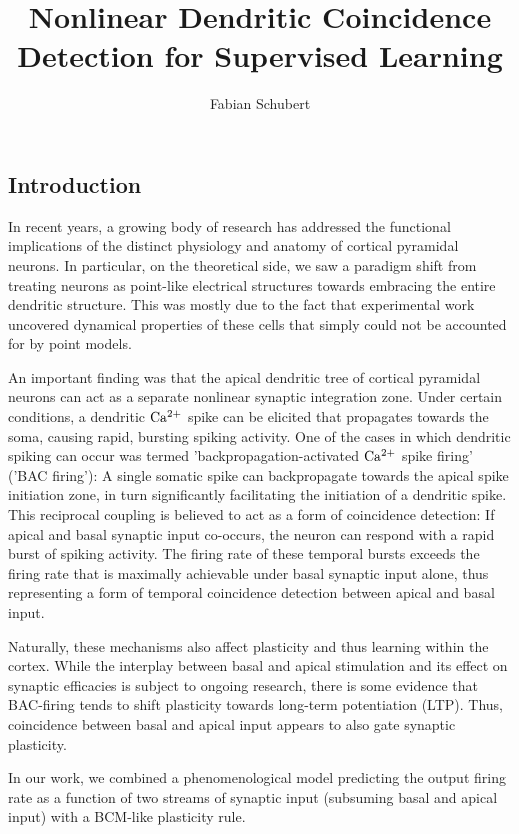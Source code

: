\documentclass[10pt,a4paper]{article}
\author{Fabian Schubert}
\title{Nonlinear Dendritic Coincidence Detection for Supervised Learning}
\begin{document}
	\maketitle
	\begin{multicols}{2}
		\section{Introduction}
		
		In recent years, a growing body of research has addressed the 
		functional implications of the distinct physiology and anatomy of 
		cortical pyramidal neurons. In particular, on the theoretical side,
		we saw a paradigm shift from treating neurons as point-like electrical
		structures towards embracing the entire dendritic structure. This was 
		mostly due to the fact that experimental work uncovered dynamical properties
		of these cells that simply could not be accounted for by point models.
		
		An important finding was that the apical dendritic tree of
		cortical pyramidal neurons can act as a separate nonlinear synaptic 
		integration zone. Under certain conditions, a dendritic $\rm Ca^{2+}$ spike
		can be elicited that propagates towards the soma, causing rapid, bursting
		spiking activity. One of the cases in which dendritic spiking can occur
		was termed 'backpropagation-activated $\rm Ca^{2+}$ spike firing' 
		('BAC firing'): A single somatic spike can backpropagate towards the apical
		spike initiation zone, in turn significantly facilitating the initiation of 
		a dendritic spike. This reciprocal coupling is believed to act as a form of
		coincidence detection: If apical and basal synaptic input co-occurs, the 
		neuron can respond with a rapid burst of spiking activity. The firing rate
		of these temporal bursts exceeds the firing rate that is maximally achievable 
		under basal synaptic input alone, thus representing a form of temporal coincidence
		detection between apical and basal input.
		
		Naturally, these mechanisms also affect plasticity and thus learning
		within the cortex. While the interplay between basal and apical stimulation and
		its effect on synaptic efficacies is subject to ongoing research, there is
		some evidence that BAC-firing tends to shift plasticity towards long-term potentiation
		(LTP). Thus, coincidence between basal and apical input appears to also gate synaptic
		plasticity.
		
		In our work, we combined a phenomenological model predicting the output
		firing rate as a function of two streams of synaptic input (subsuming basal and apical input)
		with a BCM-like plasticity rule.
		
	\end{multicols}
	
\end{document}
